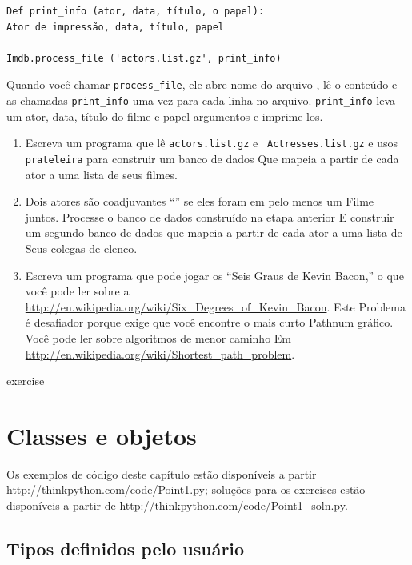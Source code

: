 \documentclass[10pt]{book}
\begin{document}
\begin{exercise}
\begin{v erbatim}
\begin{}
\begin{verbatim}
Def print_info (ator, data, título, o papel):
Ator de impressão, data, título, papel

Imdb.process_file ('actors.list.gz', print_info)
\end{verbatim}

Quando você chamar \verb "process_file", ele abre {nome do arquivo \tt}, lê o
conteúdo e as chamadas \verb "print_info" uma vez para cada linha no arquivo.
\Verb "print_info" leva um ator, data, título do filme e papel
argumentos e imprime-los.

\begin{enumerate}

\item Escreva um programa que lê {\tt actors.list.gz} e {\tt
Actresses.list.gz} e usos {\tt prateleira} para construir um banco de dados
Que mapeia a partir de cada ator a uma lista de seus filmes.

\item Dois atores são coadjuvantes ``'' se eles foram em pelo menos um
Filme juntos. Processe o banco de dados construído na etapa anterior
E construir um segundo banco de dados que mapeia a partir de cada ator a uma lista de
Seus colegas de elenco.

\item Escreva um programa que pode jogar os ``Seis Graus de Kevin
Bacon,'' o que você pode ler sobre a
\url{http://en.wikipedia.org/wiki/Six_Degrees_of_Kevin_Bacon}. Este
Problema é desafiador porque exige que você encontre o mais curto
Pathnum gráfico. Você pode ler sobre algoritmos de menor caminho
Em \url{http://en.wikipedia.org/wiki/Shortest_path_problem}.

\end{enumerate}

\end{} exercise


\chapter{Classes e objetos}

Os exemplos de código deste capítulo estão disponíveis a partir
\url{http://thinkpython.com/code/Point1.py}; soluções
para os exercises estão disponíveis a partir de
\url{http://thinkpython.com/code/Point1_soln.py}.


\section{Tipos definidos pelo usuário}
\label{ponto}


\end{v erbatim}
\end{exercise}
\end{document}
